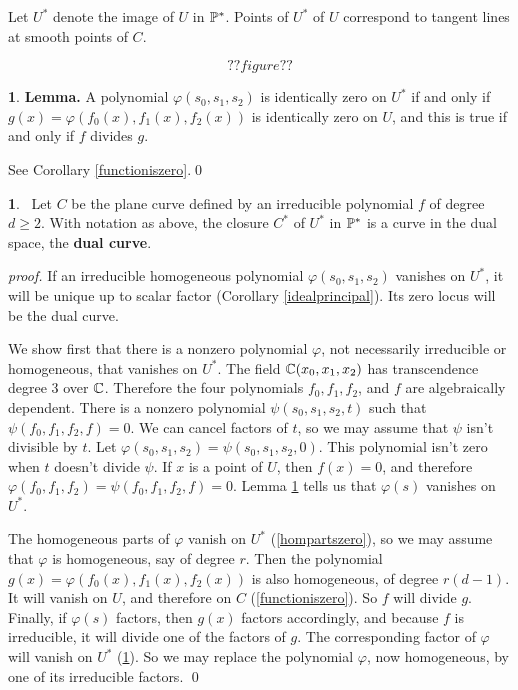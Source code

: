 \documentclass[leqno]{book}
\newcommand\Marginnote[1]{\marginnote{\hspace{-12pt}\normalfont{#1}}}
\theoremstyle{definition}%
\numberwithin{equation}{section}
\theoremstyle{theorem} %
\newtheorem{lemma}[equation]{}
\newtheorem{theorem}[equation]{}
\renewenvironment{proof}{\no \emph{proof.}}{}
\begin{document}
Let $U^*$ denote the image of $U$ in $\mathbb{P}^*$.
Points of  $U^*$ of $U$ correspond to tangent lines at
smooth points of $C$.  

$$??figure??$$


\begin{lemma}{\bf Lemma.} \label{phizerogzero}
A polynomial $\varphi(s_0,s_1,s_2)$ is identically zero on $U^*$ if
and only if $g(x)=\varphi(f_0(x),f_1(x),f_2(x))$ is identically zero
on $U$, and this is true if and only if $f$ divides $g$.
\end{lemma}

\no
See Corollary \ref{functioniszero}.\qed


\begin{theorem}{}\Marginnote{dualcurvethm}\;\,
Let $C$ be the plane curve defined by an irreducible polynomial $f$ of
degree $d\geq 2$.  With notation as above, the closure $C^*$ of $U^*$
in $\mathbb{P}^*$ is a curve in the dual space, the {\bf dual curve}.
\label{dualcurvethm} \end{theorem}


\msno
\begin{proof} If an irreducible
homogeneous polynomial $\varphi(s_0,s_1,s_2)$ vanishes on $U^*$, it
will be unique up to scalar factor (Corollary \ref{idealprincipal}).
Its zero locus will be the dual curve.

We show first that there is a nonzero polynomial $\varphi$, not
necessarily irreducible or homogeneous, that vanishes on $U^*$.  The
field $\mathbb{C}(x_0,x_1,x_2)$ has transcendence degree $3$ over $\mathbb{C}$.
Therefore the four polynomials $f_0,f_1,f_2$, and $f$ are
algebraically dependent.  There is a nonzero polynomial
$\psi(s_0,s_1,s_2,t)$ such that $\psi(f_0,f_1,f_2,f)=0$.  We can
cancel factors of $t$, so we may assume that $\psi$ isn't divisible by
$t$.  Let $\varphi(s_0,s_1,s_2) = \psi(s_0,s_1,s_2,0)$.  This
polynomial isn't zero when $t$ doesn't divide $\psi$.  If $x$ is a
point of $U$, then $f(x)=0$, and therefore $\varphi(f_0,f_1,f_2) =
\psi(f_0,f_1,f_2,f)=0$.  Lemma \ref{phizerogzero} tells us that
$\varphi(s)$ vanishes on $U^*$.

The homogeneous parts of $\varphi$ vanish on $U^*$
(\ref{hompartszero}), so we may assume that $\varphi$ is homogeneous,
say of degree $r$.  Then the polynomial $g(x) =
\varphi(f_0(x),f_1(x),f_2(x))$ is also homogeneous, of degree
$r(d-1)$.  It will vanish on $U$, and therefore on $C$
(\ref{functioniszero}).  So $f$ will divide $g$.  Finally, if
$\varphi(s)$ factors, then $g(x)$ factors accordingly, and because $f$
is irreducible, it will divide one of the factors of $g$.  The
corresponding factor of $\varphi$ will vanish on $U^*$
(\ref{phizerogzero}).  So we may replace the polynomial $\varphi$, now
homogeneous, by one of its irreducible factors.
\qed\end{proof}
\end{document}

